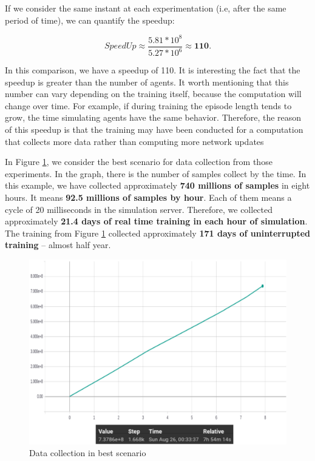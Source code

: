 If we consider the same instant at each experimentation (i.e, after the same period of time), we can quantify the speedup:

\begin{equation}
	SpeedUp \approx \frac{5.81 * 10^{8}}{5.27 * 10^{6}} \approx \textbf{110}.
\end{equation}

In this comparison, we have a speedup of 110. It is interesting the fact that the speedup is greater than the number of agents. It worth mentioning that this number can vary depending on the training itself, because the computation will change over time. For example, if during training the episode length tends to grow, the time simulating agents have the same behavior. Therefore, the reason of this speedup is that the training may have been conducted for a computation that collects more data rather than computing more network updates


In Figure \ref{fig:absdatacollection}, we consider the best scenario for data collection from those experiments. In the graph, there is the number of samples collect by the time.
In this example, we have collected approximately \textbf{740 millions of samples} in eight hours. It means \textbf{92.5 millions of samples by hour}. Each of them means a cycle of 20 milliseconds in the simulation server. Therefore, we collected approximately \textbf{21.4 days of real time training in each hour of simulation}. The training from Figure \ref{fig:absdatacollection} collected approximately \textbf{171 days of uninterrupted training} -- almost half year.

\begin{figure}[!htbp]
	\centering
	\includegraphics[width=1\textwidth]{Cap6/absolutedatacollection}
	\caption{Data collection in best scenario}
	\label{fig:absdatacollection}
\end{figure}



